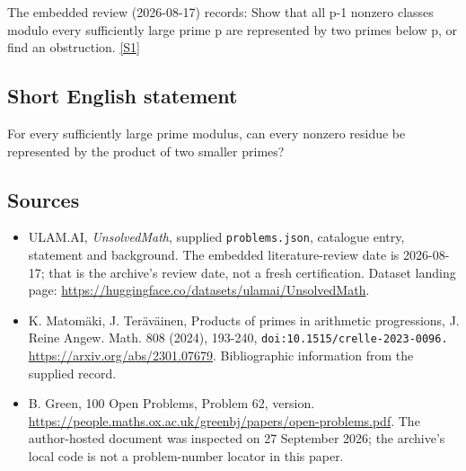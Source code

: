 \documentclass[11pt,a4paper]{article}
\newcommand{\sref}[2]{\hyperlink{source:#1:#2}{[S#2]}}
\begin{document}
The embedded review (2026-08-17) records: Show that all p-1 nonzero classes modulo every sufficiently large prime p are represented by two primes below p, or find an obstruction. \sref{statement}{1}

\subsection{Short English statement}

For every sufficiently large prime modulus, can every nonzero residue be represented by the product of two smaller primes?

\subsection{Sources}

{\small

\begin{itemize}

\item[\hypertarget{source:statement:1}{S1}] ULAM.AI, \emph{UnsolvedMath}, supplied \texttt{problems.json}, catalogue entry, statement and background. The embedded literature-review date is 2026-08-17; that is the archive’s review date, not a fresh certification. Dataset landing page: \url{https://huggingface.co/datasets/ulamai/UnsolvedMath}.

\item[\hypertarget{source:statement:2}{S2}] K. Matomäki, J. Teräväinen, Products of primes in arithmetic progressions, J. Reine Angew. Math. 808 (2024), 193-240, \nolinkurl{doi:10.1515/crelle-2023-0096.} \url{https://arxiv.org/abs/2301.07679}. Bibliographic information from the supplied record.

\item[\hypertarget{source:statement:3}{S3}] B. Green, 100 Open Problems, Problem 62, version. \url{https://people.maths.ox.ac.uk/greenbj/papers/open-problems.pdf}. The author-hosted document was inspected on 27 September 2026; the archive’s local code is not a problem-number locator in this paper.

\end{itemize}

}

\label{end:statement}
\end{document}
